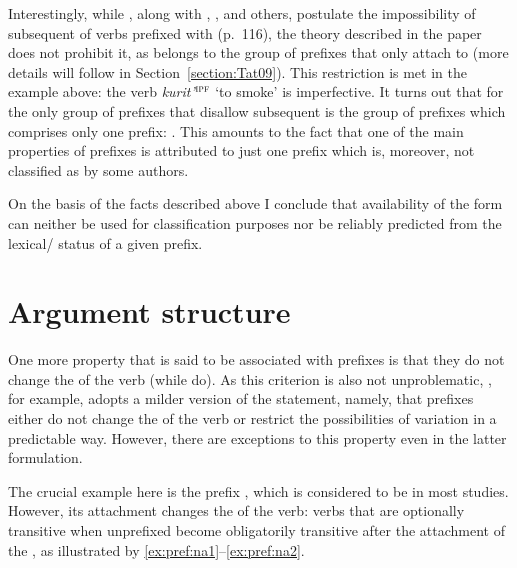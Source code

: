 Interestingly, while \citet{Tatevosov:09}, along with \citet{Svenonius:04b}, \citet{Ramchand:04}, and others, postulate the impossibility of subsequent  of verbs prefixed with   (p.~116), the theory described in the paper does not prohibit it, as  belongs to the group of prefixes that only attach to  (more details will follow in Section~\ref{section:Tat09}). This restriction is met in the example above: the verb \textit{kurit'}$^{\textsc{ipf}}$ `to smoke' is imperfective. It turns out that for \citet{Tatevosov:09} the only group of prefixes that disallow subsequent  is the group of  prefixes which comprises only one prefix:  . This amounts to the fact that one of the main properties of  prefixes is attributed to just one prefix which is, moreover, not classified as  by some authors.

On the basis of the facts described above I conclude that availability of the  form can neither be used for classification purposes nor be reliably predicted from the lexical/ status of a given prefix.

\section{Argument structure}\label{section:new:argstructure}
One more property that is said to be associated with  prefixes is that they do not change the  of the verb (while  do). As this criterion is also not unproblematic, \citet[116]{Tatevosov:09}, for example, adopts a milder version of the statement, namely, that  prefixes either do not change the  of the verb or restrict the possibilities of  variation in a predictable way. However, there are exceptions to this property even in the latter formulation. 

The crucial example here is the  prefix , which is considered to be  in most studies. However, its attachment changes the  of the verb: verbs that are optionally transitive when unprefixed become obligatorily transitive after the attachment of the  , as illustrated by \ref{ex:pref:na1}--\ref{ex:pref:na2}.

